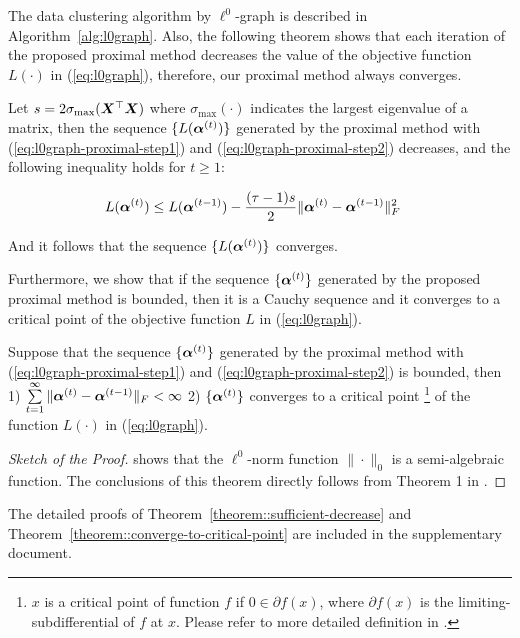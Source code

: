 \documentclass[10pt,twocolumn,letterpaper]{article}
\begin{document}
The data clustering algorithm by $\ell^{0}$-graph is described in Algorithm~\ref{alg:l0graph}. Also, the following theorem shows that each iteration of the proposed proximal method decreases the value of the objective function $L(\cdot)$ in (\ref{eq:l0graph}), therefore, our proximal method always converges.
\begin{MyTheorem}\label{theorem::sufficient-decrease}
Let $s = 2 \sigma_{\max}({\bm X^\top}{\bm X})$ where $\sigma_{\max}(\cdot)$ indicates the largest eigenvalue of a matrix, then the sequence $\{L(\bm{\alpha}^{(t)})\}$ generated by the proximal method with (\ref{eq:l0graph-proximal-step1}) and (\ref{eq:l0graph-proximal-step2}) decreases, and the following inequality holds for $t \ge 1$:
\begin{small}\begin{align}\label{eq:l0graph-proximal-sufficient-decrease}
&L(\bm{\alpha}^{(t)}) \le L(\bm{\alpha}^{(t-1)}) - \frac{(\tau-1)s}{2} \|{\bm{\alpha}}^{(t)} - {\bm{\alpha}}^{(t-1)}\|_F^2
\end{align}\end{small}
And it follows that the sequence $\{L(\bm{\alpha}^{(t)})\}$ converges.
\end{MyTheorem}
Furthermore, we show that if the sequence $\{\bm{\alpha}^{(t)}\}$ generated by the proposed proximal method is bounded, then it is a Cauchy sequence and it converges to a critical point of the objective function $L$ in (\ref{eq:l0graph}).
\begin{MyTheorem}\label{theorem::converge-to-critical-point}
Suppose that the sequence $\{\bm{\alpha}^{(t)}\}$ generated by the proximal method with (\ref{eq:l0graph-proximal-step1}) and (\ref{eq:l0graph-proximal-step2}) is bounded, then
1) $\sum\limits_{t=1}^{\infty} \|\bm{\alpha}^{(t)} - \bm{\alpha}^{(t-1)}\|_F < \infty$
2) $\{\bm{\alpha}^{(t)}\}$ converges to a critical point \footnote{$x$ is a critical point of function $f$ if $0 \in \partial f (x)$, where $\partial f(x)$ is the limiting-subdifferential of $f$ at $x$. Please refer to more detailed definition in \cite{BoltePAL2014}. } of the function $L(\cdot)$ in (\ref{eq:l0graph}).
\end{MyTheorem}
\begin{proof}[Sketch of the Proof]
\cite{BoltePAL2014} shows that the $\ell^{0}$-norm function $\|\cdot\|_0$ is a semi-algebraic function. The conclusions of this theorem directly follows from Theorem 1 in \cite{BoltePAL2014}.
\end{proof}
The detailed proofs of Theorem~\ref{theorem::sufficient-decrease} and Theorem~\ref{theorem::converge-to-critical-point} are included in the supplementary document.
\end{document}
